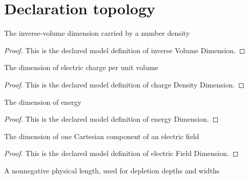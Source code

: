 \section{Declaration topology}
\begin{definition}
  \label{def:physics:phyx-mini-0630:phyxminiproblems-problemphyxmini0630-inversevolumedimension}
  The inverse-volume dimension carried by a number density
\end{definition}
\begin{proof}
  This is the declared model definition of inverse Volume Dimension.
\end{proof}
\begin{definition}
  \label{def:physics:phyx-mini-0630:phyxminiproblems-problemphyxmini0630-chargedensitydimension}
  The dimension of electric charge per unit volume
\end{definition}
\begin{proof}
  This is the declared model definition of charge Density Dimension.
\end{proof}
\begin{definition}
  \label{def:physics:phyx-mini-0630:phyxminiproblems-problemphyxmini0630-energydimension}
  The dimension of energy
\end{definition}
\begin{proof}
  This is the declared model definition of energy Dimension.
\end{proof}
\begin{definition}
  \label{def:physics:phyx-mini-0630:phyxminiproblems-problemphyxmini0630-electricfielddimension}
  The dimension of one Cartesian component of an electric field
\end{definition}
\begin{proof}
  This is the declared model definition of electric Field Dimension.
\end{proof}
\begin{definition}
  \label{def:physics:phyx-mini-0630:phyxminiproblems-problemphyxmini0630-lengthquantity}
  A nonnegative physical length, used for depletion depths and widths
\end{definition}
